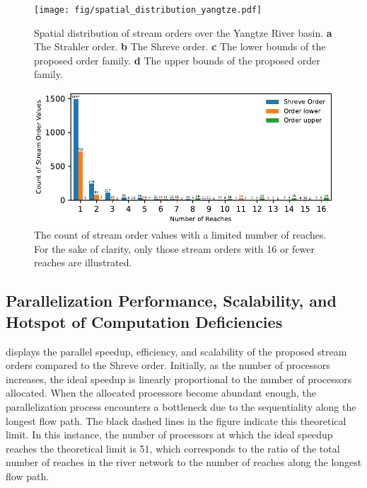 \documentclass[water,article,submit,pdftex,moreauthors]{Definitions/mdpi}
\begin{document}
\begin{figure}[H]
    \texttt{[image: fig/spatial\_distribution\_yangtze.pdf]}
    \caption{Spatial distribution of stream orders over the Yangtze River basin. \textbf{a} The Strahler order. \textbf{b} The Shreve order. \textbf{c} The lower bounds of the proposed order family. \textbf{d} The upper bounds of the proposed order family. \label{fig:spatial_distribution_yangtze}}
\end{figure}

\begin{figure}[H]
    \includegraphics[width=13.5 cm]{fig/stream_count_yangtze.pdf}
    \caption{The count of stream order values with a limited number of reaches. For the sake of clarity, only those stream orders with 16 or fewer reaches are illustrated. \label{fig:cumulative_count_yangtze}}
\end{figure}

\subsection{Parallelization Performance, Scalability, and Hotspot of Computation Deficiencies}
\label{sec:parallelization_yangtze}

 displays the parallel speedup, efficiency, and scalability of the proposed stream orders compared to the Shreve order. Initially, as the number of processors increases, the ideal speedup is linearly proportional to the number of processors allocated. When the allocated processors become abundant enough, the parallelization process encounters a bottleneck due to the sequentiality along the longest flow path. The black dashed lines in the figure indicate this theoretical limit. In this instance, the number of processors at which the ideal speedup reaches the theoretical limit is 51, which corresponds to the ratio of the total number of reaches in the river network to the number of reaches along the longest flow path.
\end{document}
